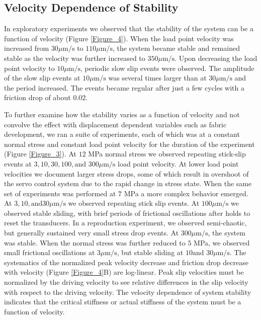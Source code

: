 \subsection{Velocity Dependence of Stability}
In exploratory experiments we observed that the stability of the system can be a function of velocity (Figure \ref{Figure_4}). When the load point velocity was increased from $30 \mu\text{m/s}$ to $110 \mu\text{m/s}$, the system became stable and remained stable as the velocity was further increased to $350 \mu\text{m/s}$. Upon decreasing the load point velocity to $10 \mu\text{m/s}$, periodic slow slip events were observed. The amplitude of the slow slip events at $10 \mu\text{m/s}$ was several times larger than at $30 \mu\text{m/s}$ and the period increased. The events became regular after just a few cycles with a friction drop of about $0.02$.
 
To further examine how the stability varies as a function of velocity and not convolve the effect with displacement dependent variables such as fabric development, we ran a suite of experiments, each of which was at a constant normal stress and constant load point velocity for the duration of the experiment (Figure \ref{Figure_3}). At $12$ MPa normal stress we observed repeating stick-slip events at $3, 10, 30, 100, \text{and } 300 \mu\text{m/s}$ load point velocity. At lower load point velocities we document larger stress drops, some of which result in overshoot of the servo control system due to the rapid change in stress state. When the same set of experiments was performed at $7$ MPa a more complex behavior emerged. At $3, 10, \text{and} 30 \mu\text{m/s}$ we observed repeating stick slip events. At $100 \mu\text{m/s}$ we observed stable sliding, with brief periods of frictional oscillations after holds to reset the transducers. In a reproduction experiment, we observed semi-chaotic, but generally sustained very small stress drop events. At $300 \mu\text{m/s}$, the system was stable. When the normal stress was further reduced to $5$ MPa, we observed small frictional oscillations at $3 \mu\text{m/s}$, but stable sliding at $10 \text{and } 30 \mu\text{m/s}$. The systematics of the normalized peak velocity decrease and friction drop decrease with velocity (Figure \ref{Figure_4}B) are log-linear. Peak slip velocities must be normalized by the driving velocity to see relative differences in the slip velocity with respect to the driving velocity. The velocity dependence of system stability indicates that the critical stiffness or actual stiffness of the system must be a function of velocity.

